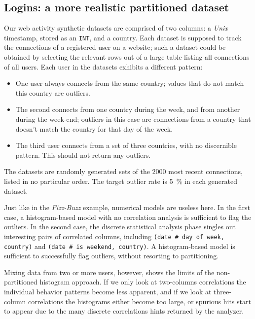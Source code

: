 \subsection{Logins: a more realistic partitioned dataset}

Our web activity synthetic datasets are comprised of two columns: a \emph{Unix} timestamp, stored as an \texttt{INT}, and a country. Each dataset is supposed to track the connections of a registered user on a website; such a dataset could be obtained by selecting the relevant rows out of a large table listing all connections of all users. Each user in the datasets exhibits a different pattern:

\begin{itemize}
\item One user always connects from the same country; values that do not match this country are outliers.
\item The second connects from one country during the week, and from another during the week-end; outliers in this case are connections from a country that doesn't match the country for that day of the week.
\item The third user connects from a set of three countries, with no discernible pattern. This should not return any outliers.
\end{itemize}

The datasets are randomly generated sets of the 2000 most recent connections, listed in no particular order. The target outlier rate is \SI{5}{\percent} in each generated dataset.

Just like in the \emph{Fizz-Buzz} example, numerical models are useless here. In the first case, a histogram-based model with no correlation analysis is sufficient to flag the outliers. In the second case, the discrete statistical analysis phase singles out interesting pairs of correlated columns, including \texttt{(date\,\#\,day of week, country)} and \texttt{(date\,\#\,is weekend, country)}. A histogram-based model is sufficient to successfully flag outliers, without resorting to partitioning.


Mixing data from two or more users, however, shows the limits of the non-partitioned histogram approach. If we only look at two-columns correlations the individual behavior patterns become less apparent, and if we look at three-column correlations the histograms either become too large, or spurious hits start to appear due to the many discrete correlations hints returned by the analyzer.

